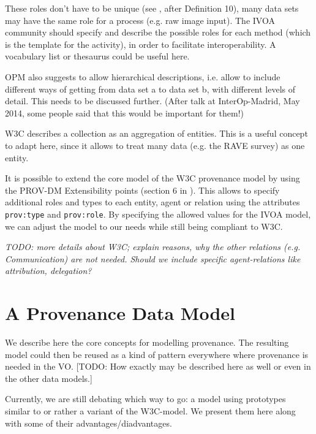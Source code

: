 \documentclass[11pt,a4paper]{ivoa}
\begin{document}
These roles don't have to be unique (see \cite{moreau2010}, after Definition 10), many data sets may have the same role for a process (e.g. raw image input).
The IVOA community should specify and describe the possible roles for each method (which is the template for the activity), in order to facilitate interoperability. A vocabulary list or thesaurus could be useful here.

OPM also suggests to allow hierarchical descriptions, i.e. allow to include different ways of getting from data set a to data set b, with different levels of detail. 
This needs to be discussed further. 
(After talk at InterOp-Madrid, May 2014, some people said that this would be important for them!)

W3C describes a collection as an aggregation of entities. This is a useful concept to adapt here, since it allows to treat many data (e.g. the RAVE survey) as one entity.

It is possible to extend the core model of the W3C provenance model by using the PROV-DM Extensibility points (section 6 in \cite{std:W3CProvDM}). This allows to specify additional roles and types to each entity, agent or relation using the attributes \texttt{prov:type} and \texttt{prov:role}.
By specifying the allowed values for the IVOA model, we can adjust the model to our needs while still being compliant to W3C.





\emph{TODO: more details about W3C; explain reasons, why the other relations (e.g. Communication) are not needed. Should we include specific agent-relations like attribution, delegation?}



\section{A Provenance Data Model}
We describe here the core concepts for modelling provenance. The resulting model could then be reused as a kind of pattern everywhere where provenance is needed in the VO. [TODO: How exactly may be described here as well or even in the other data models.] 


Currently, we are still debating which way to go: a model using prototypes similar to \cite{std:SimDM} or rather a variant of the W3C-model.
We present them here along with some of their advantages/diadvantages.
\end{document}
